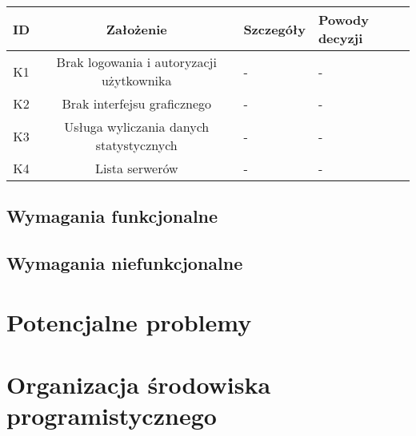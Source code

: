 \begin{center}
\begin{tabular}{|c|c|l|l|}
\hline
\textbf{ID} & \textbf{Założenie} & \textbf{Szczegóły} & \textbf{Powody decyzji} \\
\hline
\label{z:k1} K1 & Brak logowania i autoryzacji użytkownika &  - & - \\
\hline
\label{z:k2} K2 & Brak interfejsu graficznego &  - & - \\
\hline
\label{z:k3} K3 & Usługa wyliczania danych statystycznych &  - & - \\
\hline
\label{z:k4} K4 & Lista serwerów &  - & - \\
\hline
\end{tabular} 

\end{center}

\subsection[Wymagania funkcjonalne]{Wymagania funkcjonalne}

\subsection[Wymagania niefunkcjonalne]{Wymagania niefunkcjonalne}

\section[Potencjalne problemy]{Potencjalne problemy}

\section[Organizacja środowiska programistycznego]{Organizacja środowiska programistycznego}